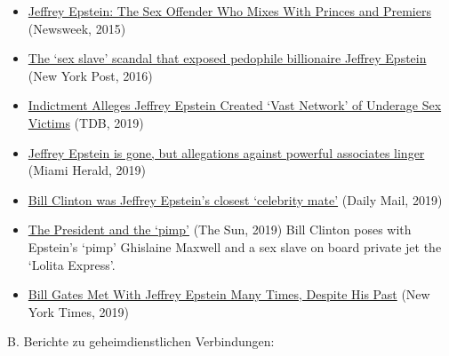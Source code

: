 \begin{itemize}
\tightlist
\item
  \href{https://www.newsweek.com/2015/02/06/sex-offender-who-mixes-princes-and-premiers-302877.html}{Jeffrey
  Epstein: The Sex Offender Who Mixes With Princes and Premiers}
  (Newsweek, 2015)
\item
  \href{https://nypost.com/2016/10/09/the-sex-slave-scandal-that-exposed-pedophile-billionaire-jeffrey-epstein/}{The
  `sex slave' scandal that exposed pedophile billionaire Jeffrey
  Epstein} (New York Post, 2016)
\item
  \href{https://www.thedailybeast.com/jeffrey-epstein-charged-with-sex-trafficking}{Indictment
  Alleges Jeffrey Epstein Created `Vast Network' of Underage Sex
  Victims} (TDB, 2019)
\item
  \href{https://www.miamiherald.com/news/local/article233728717.html}{Jeffrey
  Epstein is gone, but allegations against powerful associates linger}
  (Miami Herald, 2019)
\item
  \href{https://www.dailymail.co.uk/news/article-7748467/Bill-Hillary-Clinton-frequent-guests-Jeffrey-Epsteins-New-Mexico-ranch.html}{Bill
  Clinton was Jeffrey Epstein's closest `celebrity mate'} (Daily Mail,
  2019)
\item
  \href{https://www.the-sun.com/news/us-news/224545/bill-clinton-jeffery-epsteins-ghislaine-maxwell-lolita-express/}{The
  President and the `pimp'} (The Sun, 2019) Bill Clinton poses with
  Epstein's `pimp' Ghislaine Maxwell and a sex slave on board private
  jet the `Lolita Express'.
\item
  \href{https://www.nytimes.com/2019/10/12/business/jeffrey-epstein-bill-gates.html}{Bill
  Gates Met With Jeffrey Epstein Many Times, Despite His Past} (New York
  Times, 2019)
\end{itemize}

B. Berichte zu geheimdienstlichen Verbindungen:

